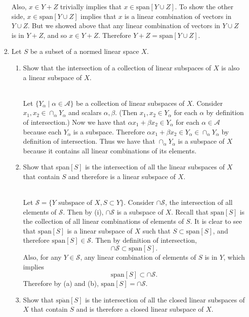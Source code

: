 \begin{enumerate}
    Also, $x\in Y+Z$ trivially implies that $x\in\text{span}[Y\cup Z]$. 
    To show the other side, $x\in\text{span}[Y\cup Z]$ implies that $x$ is a linear combination of vectors in $Y\cup Z$.
    But we showed above that any linear combination of vectors in $Y\cup Z$ is in $Y+Z$, and so $x\in Y+Z$.
    Therefore $Y+Z=\text{span}[Y\cup Z]$.
    \ \\\item Let $S$ be a subset of a normed linear space $X$.
    \begin{enumerate}[label=(\roman*),align=left]
        \item Show that the intersection of a collection of linear subspaces of $X$ is also a linear subspace of $X$.
        
        \ \\Let $\{Y_\alpha\mid \alpha\in \mathcal{A}\}$ be a collection of linear subspaces of $X$.
        Consider $x_1,x_2\in \cap_\alpha Y_\alpha$ and scalars $\alpha,\beta$.
        (Then $x_1,x_2\in Y_\alpha$ for each $\alpha$ by definition of intersection.)
        Now we have that $\alpha x_1+\beta x_2\in Y_\alpha$ for each $\alpha\in\mathcal{A}$ because each $Y_\alpha$ is a subspace.
        Therefore $\alpha x_1+\beta x_2\in Y_\alpha\in\cap_\alpha Y_\alpha$ by definition of intersection.
        Thus we have that $\cap_\alpha Y_\alpha$ is a subspace of $X$ because it contains all linear combinations of its elements.
        \\\item Show that span$[S]$ is the intersection of all the linear subspaces of $X$ that contain $S$ and therefore is a linear subspace of $X$.
        
        \ \\Let $\mathcal{S}=\{Y\text{ subspace of }X,S\subset Y\}$.
        Consider $\cap\mathcal{S}$, the intersection of all elements of $\mathcal{S}$.
        Then by (i), $\cap\mathcal{S}$ is a subspace of $X$.
        Recall that $\text{span}[S]$ is the collection of all linear combinations of elements of $S$.
        It is clear to see that $\text{span}[S]$ is a linear subspace of $X$ such that $S\subset\text{span}[S]$, and therefore $\text{span}[S]\in\mathcal{S}$.
        Then by definition of intersection, 
        \[
            \cap\mathcal{S}\subset \text{span}[S].\tag{a}
        \]
        Also, for any $Y\in\mathcal{S}$, any linear combination of elements of $S$ is in $Y$, which implies
        \[
            \text{span}[S]\subset\cap\mathcal{S}.\tag{b}
        \]
        Therefore by (a) and (b), $\text{span}[S]=\cap\mathcal{S}$.
        \\\item Show that $\overline{\text{span}}[S]$ is the intersection of all the closed linear subspaces of $X$ that contain $S$ and is therefore a closed linear subspace of $X$. 


\end{enumerate}
\end{enumerate}
